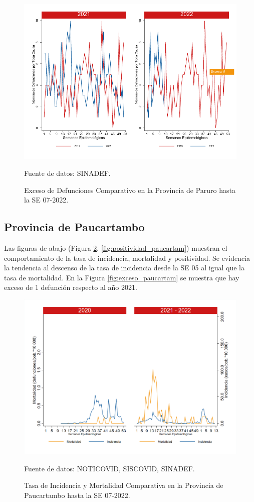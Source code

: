 \documentclass[12pt,a4paper,openany]{book}
\begin{document}
		\begin{figure}[h]
			\caption{Exceso de Defunciones Comparativo en la Provincia de Paruro hasta la SE 07-2022.}\label{fig:exceso_paruro}
			\begin{center}
				\includegraphics[width=0.7\linewidth]{../figuras/exceso_10.pdf}
			\end{center}
			{\footnotesize {Fuente de datos: SINADEF.}}
		\end{figure}
		
		
		\clearpage
		
		\subsection*{Provincia de Paucartambo}
		\noindent Las figuras de abajo (Figura \ref{fig:inc_mort_paucartam}, \ref{fig:positividad_paucartam}) muestran el comportamiento de la tasa de incidencia, mortalidad y positividad. Se evidencia la tendencia al descenso de la tasa de incidencia desde la SE 05 al igual que la tasa de mortalidad.   
	En la Figura \ref{fig:exceso_paucartam} se muestra que hay exceso de 1 defunción respecto al año 2021.  
		
		\begin{figure}[h]
			\caption{Tasa de Incidencia y Mortalidad Comparativa en la Provincia de Paucartambo hasta la SE 07-2022.}\label{fig:inc_mort_paucartam}
			\begin{center}
				\includegraphics[width=0.85\linewidth]{../figuras/incidencia_mortalidad_20_21_11.png}
			\end{center}
			{\footnotesize {Fuente de datos: NOTICOVID, SISCOVID, SINADEF.}}
		\end{figure}
		
\end{document}
